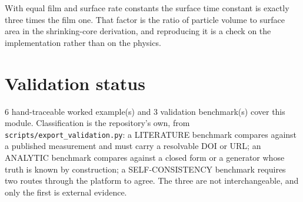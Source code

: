 \documentclass[10pt,a4paper,twoside]{report}
\begin{document}
With equal film and surface rate constants the surface time constant is exactly three times the film one. That factor is the ratio of particle volume to surface area in the shrinking-core derivation, and reproducing it is a check on the implementation rather than on the physics.

\section{Validation status}

6 hand-traceable worked example(s) and 3 validation benchmark(s) cover this module. Classification is the repository's own, from \texttt{scripts/export\_validation.py}: a LITERATURE benchmark compares against a published measurement and must carry a resolvable DOI or URL; an ANALYTIC benchmark compares against a closed form or a generator whose truth is known by construction; a SELF-CONSISTENCY benchmark requires two routes through the platform to agree. The three are not interchangeable, and only the first is external evidence.

\footnotesize
\end{document}
